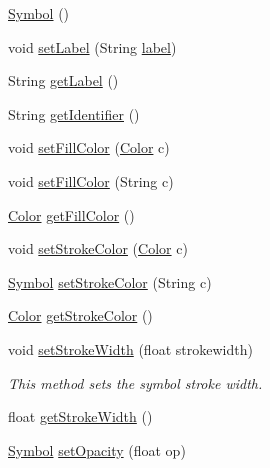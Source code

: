 \begin{DoxyCompactItemize}
\item 
\hyperlink{classbridges_1_1base_1_1_symbol_a5449cffb7ffdbab093a110957158acc6}{Symbol} ()
\item 
void \hyperlink{classbridges_1_1base_1_1_symbol_af6b944374cbd34334caac28d948a3f21}{set\+Label} (String \hyperlink{classbridges_1_1base_1_1_symbol_ad2adcc82e6a96c2f3c465702502655e9}{label})
\item 
String \hyperlink{classbridges_1_1base_1_1_symbol_a7616c25b288a6e464f4f0b5fe4bd2826}{get\+Label} ()
\item 
String \hyperlink{classbridges_1_1base_1_1_symbol_a53cea862b06ffc230ca68d4d34c8820d}{get\+Identifier} ()
\item 
void \hyperlink{classbridges_1_1base_1_1_symbol_a850688e5157674aee916fef6cd9e0b8c}{set\+Fill\+Color} (\hyperlink{classbridges_1_1base_1_1_color}{Color} c)
\item 
void \hyperlink{classbridges_1_1base_1_1_symbol_a3a2c48d9707ff3fa7a832e77b679b1b9}{set\+Fill\+Color} (String c)
\item 
\hyperlink{classbridges_1_1base_1_1_color}{Color} \hyperlink{classbridges_1_1base_1_1_symbol_aed2e531266c8a3bc563709c6486380cc}{get\+Fill\+Color} ()
\item 
void \hyperlink{classbridges_1_1base_1_1_symbol_a387a5a5691e55e84a1d0367ca2066806}{set\+Stroke\+Color} (\hyperlink{classbridges_1_1base_1_1_color}{Color} c)
\item 
\hyperlink{classbridges_1_1base_1_1_symbol}{Symbol} \hyperlink{classbridges_1_1base_1_1_symbol_ae9aa7d4e9b497875017a9b6e0eaab181}{set\+Stroke\+Color} (String c)
\item 
\hyperlink{classbridges_1_1base_1_1_color}{Color} \hyperlink{classbridges_1_1base_1_1_symbol_abd38aaea2fc344adcc8096ed6eb8681c}{get\+Stroke\+Color} ()
\item 
void \hyperlink{classbridges_1_1base_1_1_symbol_a68f46f0e555e916c59a69d2b3e9e495d}{set\+Stroke\+Width} (float strokewidth)
\begin{DoxyCompactList}\small\item\em This method sets the symbol stroke width. \end{DoxyCompactList}\item 
float \hyperlink{classbridges_1_1base_1_1_symbol_a9c79f84ba764b7683c99c5deb1f5a191}{get\+Stroke\+Width} ()
\item 
\hyperlink{classbridges_1_1base_1_1_symbol}{Symbol} \hyperlink{classbridges_1_1base_1_1_symbol_abac237b439448cbef3744817d14061c5}{set\+Opacity} (float op)

\end{DoxyCompactItemize}
